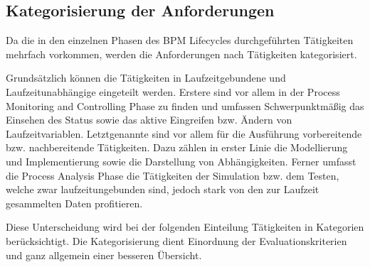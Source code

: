 %
%
\subsection{Kategorisierung der Anforderungen}
\label{herleitungKategorien}
Da die in den einzelnen Phasen des \ac{BPM} Lifecycles durchgeführten Tätigkeiten mehrfach vorkommen, werden die Anforderungen nach Tätigkeiten kategorisiert.

Grundsätzlich können die Tätigkeiten in Laufzeitgebundene und Laufzeitunabhängige eingeteilt werden. Erstere sind vor allem in der Process Monitoring and Controlling Phase zu finden und umfassen Schwerpunktmäßig das Einsehen des Status sowie das aktive Eingreifen bzw. Ändern von Laufzeitvariablen. Letztgenannte sind vor allem für die Ausführung vorbereitende bzw. nachbereitende Tätigkeiten. Dazu zählen in erster Linie die Modellierung und Implementierung sowie die Darstellung von Abhängigkeiten. Ferner umfasst die Process Analysis Phase die Tätigkeiten der Simulation bzw. dem Testen, welche zwar laufzeitungebunden sind, jedoch stark von den zur Laufzeit gesammelten Daten profitieren.

\newpage
\noindent Diese Unterscheidung wird bei der folgenden Einteilung Tätigkeiten in Kategorien berücksichtigt. Die Kategorisierung dient Einordnung der Evaluationskriterien und ganz allgemein einer besseren Übersicht.

